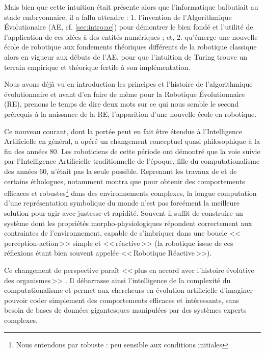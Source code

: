 Mais bien que cette intuition était présente alors que l'informatique balbutiait au stade embryonnaire, il a fallu attendre : 1. l'invention de l'Algorithmique \'Evolutionaire (AE, cf. \ref{sec:intro:ae}) pour démontrer le bien fondé et l'utilité de l'application de ces idées à des entités numériques ; et, 2. qu'émerge une nouvelle école de robotique aux fondements théoriques différents de la robotique classique alors en vigueur aux débuts de l'AE, pour que l'intuition de Turing trouve un terrain empirique et théorique fertile à son implémentation.

Nous avons déjà vu en introduction les principes et l'histoire de l'algorithmique évolutionnaire et avant d'en faire de même pour la Robotique \'Evolutionnaire (RE), prenons le temps de dire deux mots sur ce qui nous semble le second prérequis à la naissance de la RE, l'apparition d'une nouvelle école en robotique.

Ce nouveau courant, dont la portée peut en fait être étendue à l'Intelligence Artificielle en général, a opéré un changement conceptuel quasi philosophique à la fin des années 80. Les roboticiens de cette période ont démontré que la voie suivie par l'Intelligence Artificielle traditionnelle de l'époque, fille du computationalisme des années 60, n'était pas la seule possible. Reprenant les travaux de \citet{braintenberg86vehicles} et de certains éthologues, \cite{brooks91intelligencewithoutreason} notamment montra que pour obtenir des comportements efficaces et robustes\footnote{Nous entendons par robuste : peu sensible aux conditions initiales} dans des environnements complexes, la longue computation d'une représentation symbolique du monde n'est pas forcément la meilleure solution pour agir avec justesse et rapidité. Souvent il suffit de construire un système dont les propriétés morpho-physiologiques répondent correctement aux contraintes de l'environnement, capable de s'imbriquer dans une boucle <<\,perception-action\,>> simple et <<\,réactive\,>> (la robotique issue de ces réflexions étant bien souvent appelée <<\,Robotique Réactive\,>>).

Ce changement de perspective paraît <<\,plus en accord avec l'histoire évolutive des organismes\,>> \citep[Brooks dans la préface de ][p. 15]{pfeifer2006howthebodyshapesthewaywethink}. Il débarrasse ainsi l'intelligence de la complexité du computationalisme et permet aux chercheurs en évolution artificielle d'imaginer pouvoir coder simplement des comportements efficaces et intéressants, sans besoin de bases de données gigantesques manipulées par des systèmes experts complexes.

